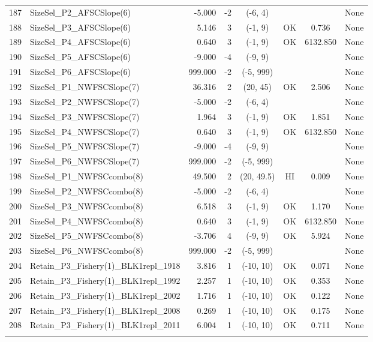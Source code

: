 \documentclass[12pt,]{article}
\begin{document}
\begin{landscape}
\begin{longtable}{rlrrcccl}
  187 & SizeSel\_P2\_AFSCSlope(6) & -5.000 & -2 & (-6, 4) &  &  & None \\ 
  188 & SizeSel\_P3\_AFSCSlope(6) & 5.146 & 3 & (-1, 9) & OK & 0.736 & None \\ 
  189 & SizeSel\_P4\_AFSCSlope(6) & 0.640 & 3 & (-1, 9) & OK & 6132.850 & None \\ 
  190 & SizeSel\_P5\_AFSCSlope(6) & -9.000 & -4 & (-9, 9) &  &  & None \\ 
  191 & SizeSel\_P6\_AFSCSlope(6) & 999.000 & -2 & (-5, 999) &  &  & None \\ 
  192 & SizeSel\_P1\_NWFSCSlope(7) & 36.316 & 2 & (20, 45) & OK & 2.506 & None \\ 
  193 & SizeSel\_P2\_NWFSCSlope(7) & -5.000 & -2 & (-6, 4) &  &  & None \\ 
  194 & SizeSel\_P3\_NWFSCSlope(7) & 1.964 & 3 & (-1, 9) & OK & 1.851 & None \\ 
  195 & SizeSel\_P4\_NWFSCSlope(7) & 0.640 & 3 & (-1, 9) & OK & 6132.850 & None \\ 
  196 & SizeSel\_P5\_NWFSCSlope(7) & -9.000 & -4 & (-9, 9) &  &  & None \\ 
  197 & SizeSel\_P6\_NWFSCSlope(7) & 999.000 & -2 & (-5, 999) &  &  & None \\ 
  198 & SizeSel\_P1\_NWFSCcombo(8) & 49.500 & 2 & (20, 49.5) & HI & 0.009 & None \\ 
  199 & SizeSel\_P2\_NWFSCcombo(8) & -5.000 & -2 & (-6, 4) &  &  & None \\ 
  200 & SizeSel\_P3\_NWFSCcombo(8) & 6.518 & 3 & (-1, 9) & OK & 1.170 & None \\ 
  201 & SizeSel\_P4\_NWFSCcombo(8) & 0.640 & 3 & (-1, 9) & OK & 6132.850 & None \\ 
  202 & SizeSel\_P5\_NWFSCcombo(8) & -3.706 & 4 & (-9, 9) & OK & 5.924 & None \\ 
  203 & SizeSel\_P6\_NWFSCcombo(8) & 999.000 & -2 & (-5, 999) &  &  & None \\ 
  204 & Retain\_P3\_Fishery(1)\_BLK1repl\_1918 & 3.816 & 1 & (-10, 10) & OK & 0.071 & None \\ 
  205 & Retain\_P3\_Fishery(1)\_BLK1repl\_1992 & 2.257 & 1 & (-10, 10) & OK & 0.353 & None \\ 
  206 & Retain\_P3\_Fishery(1)\_BLK1repl\_2002 & 1.716 & 1 & (-10, 10) & OK & 0.122 & None \\ 
  207 & Retain\_P3\_Fishery(1)\_BLK1repl\_2008 & 0.269 & 1 & (-10, 10) & OK & 0.175 & None \\ 
  208 & Retain\_P3\_Fishery(1)\_BLK1repl\_2011 & 6.004 & 1 & (-10, 10) & OK & 0.711 & None \\ 
   \hline
\hline
\label{tab:model_params}
\end{longtable}
\end{landscape}
\end{document}
